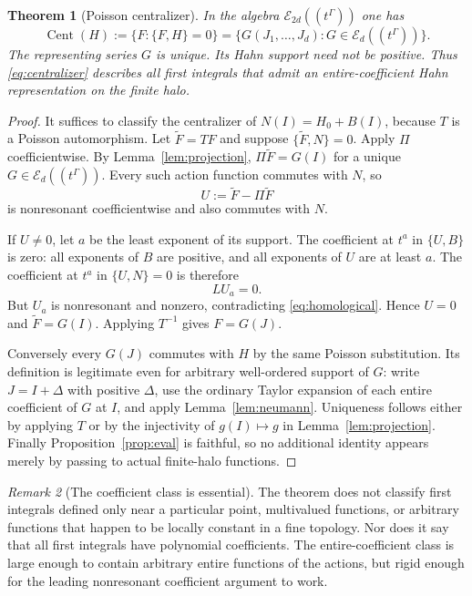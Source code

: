 \documentclass[11pt,letterpaper]{article}
\numberwithin{equation}{section}
\newtheorem{theorem}{Theorem}[section]
\theoremstyle{definition}
\theoremstyle{remark}
\newtheorem{remark}[theorem]{Remark}
\newcommand{\E}{\mathscr E}
\newcommand{\HH}[1]{#1((t^\Gamma))}
\DeclareMathOperator{\Cent}{Cent}
\begin{document}
\begin{theorem}[Poisson centralizer]\label{thm:centralizer}
In the algebra $\HH{\E_{2d}}$ one has
\begin{equation}\label{eq:centralizer}
 \Cent(H):=\{F:\{F,H\}=0\}
 =\{G(J_1,\ldots,J_d):G\in\HH{\E_d}\}.
\end{equation}
The representing series $G$ is unique. Its Hahn support need not be
positive. Thus \eqref{eq:centralizer} describes all first integrals that
admit an entire-coefficient Hahn representation on the finite halo.
\end{theorem}
\begin{proof}
It suffices to classify the centralizer of $N(I)=H_0+B(I)$, because $T$ is
a Poisson automorphism. Let $\widetilde F=TF$ and suppose
$\{\widetilde F,N\}=0$. Apply $\Pi$ coefficientwise. By
Lemma~\ref{lem:projection}, $\Pi\widetilde F=G(I)$ for a unique
$G\in\HH{\E_d}$. Every such action function commutes with $N$, so
\[
 U:=\widetilde F-\Pi\widetilde F
\]
is nonresonant coefficientwise and also commutes with $N$.

If $U\ne0$, let $a$ be the least exponent of its support. The coefficient
at $t^a$ in $\{U,B\}$ is zero: all exponents of $B$ are positive, and all
exponents of $U$ are at least $a$. The coefficient at $t^a$ in
$\{U,N\}=0$ is therefore
\[
 L U_a=0.
\]
But $U_a$ is nonresonant and nonzero, contradicting
\eqref{eq:homological}. Hence $U=0$ and $\widetilde F=G(I)$.
Applying $T^{-1}$ gives $F=G(J)$.

Conversely every $G(J)$ commutes with $H$ by the same Poisson substitution.
Its definition is legitimate even for arbitrary well-ordered support of
$G$: write $J=I+\Delta$ with positive $\Delta$, use the ordinary Taylor
expansion of each entire coefficient of $G$ at $I$, and apply
Lemma~\ref{lem:neumann}. Uniqueness follows either by applying $T$ or by the
injectivity of $g(I)\mapsto g$ in Lemma~\ref{lem:projection}. Finally
Proposition~\ref{prop:eval} is faithful, so no additional identity appears
merely by passing to actual finite-halo functions.
\end{proof}

\begin{remark}[The coefficient class is essential]
The theorem does not classify first integrals defined only near a particular
point, multivalued functions, or arbitrary functions that happen to be
locally constant in a fine topology. Nor does it say that all first
integrals have polynomial coefficients. The entire-coefficient class is
large enough to contain arbitrary entire functions of the actions, but
rigid enough for the leading nonresonant coefficient argument to work.
\end{remark}
\end{document}
